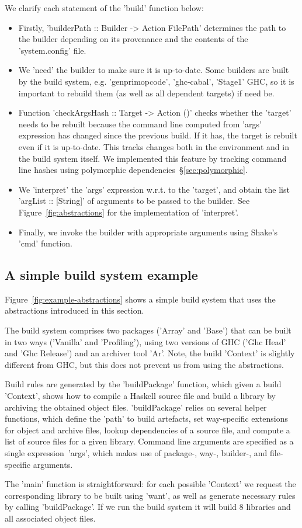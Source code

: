 \noindent We clarify each statement of the \lst'build' function below:
\begin{itemize}
  \item Firstly, \lst'builderPath :: Builder -> Action FilePath' determines the
  path to the builder depending on its provenance and the contents of the
  \lst'system.config' file.
  \item We \lst'need' the builder to make sure it is up-to-date. Some builders
  are built by the build system, e.g. \lst'genprimopcode',
  \lst'ghc-cabal', \lst'Stage1' GHC, so it is important to rebuild them (as well
  as all dependent targets) if need be.
  \item Function \lst'checkArgsHash :: Target -> Action ()' checks whether the
  \lst'target' needs to be rebuilt because the command line computed from
  \lst'args' expression has changed since the previous build. If it has,
  the target is rebuilt even if it is up-to-date. This tracks changes both in
  the environment and in the build system itself. We implemented this feature
  by tracking command line hashes using polymorphic dependencies~\S\ref{sec:polymorphic}.
  \item We \lst'interpret' the \lst'args' expression w.r.t. to the
  \lst'target', and obtain the list \lst'argList :: [String]' of arguments to be
  passed to the builder. See Figure~\ref{fig:abstractions} for the implementation of
  \lst'interpret'.
  \item Finally, we invoke the builder with appropriate arguments using Shake's
  \lst'cmd' function.
\end{itemize}

\subsection{A simple build system example}

Figure~\ref{fig:example-abstractions} shows a simple build system that uses the
abstractions introduced in this section.

The build system comprises two packages (\lst'Array' and \lst'Base') that can
be built in two ways (\lst'Vanilla' and \lst'Profiling'), using two versions
of GHC (\lst'Ghc Head' and \lst'Ghc Release') and an archiver tool \lst'Ar'.
Note, the build \lst'Context' is slightly different from GHC, but this does not
prevent us from using the abstractions.

Build rules are generated by the \lst'buildPackage' function, which given a
build \lst'Context', shows how to compile a Haskell source file and build a
library by archiving the obtained object files. \lst'buildPackage' relies on
several helper functions, which define the \lst'path' to build artefacts,
set way-specific extensions for object and archive files, lookup
dependencies of a source file, and compute a list of source files for a given
library. Command line arguments are specified as a single expression~\lst'args',
which makes use of package-, way-, builder-, and file-specific arguments.

The \lst'main' function is straightforward: for each possible \lst'Context'
we request the corresponding library to be built using \lst'want', as well as
generate necessary rules by calling \lst'buildPackage'. If we run the build
system it will build 8 libraries and all associated object files.

